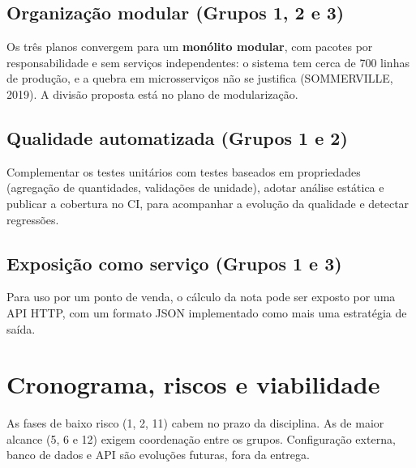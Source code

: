 \subsection{Organização modular (Grupos 1, 2 e 3)}
Os três planos convergem para um \textbf{monólito modular}, com pacotes por responsabilidade e sem serviços independentes: o sistema tem cerca de 700 linhas de produção, e a quebra em microsserviços não se justifica (SOMMERVILLE, 2019). A divisão proposta está no plano de modularização.

\subsection{Qualidade automatizada (Grupos 1 e 2)}
Complementar os testes unitários com testes baseados em propriedades (agregação de quantidades, validações de unidade), adotar análise estática e publicar a cobertura no CI, para acompanhar a evolução da qualidade e detectar regressões.

\subsection{Exposição como serviço (Grupos 1 e 3)}
Para uso por um ponto de venda, o cálculo da nota pode ser exposto por uma API HTTP, com um formato JSON implementado como mais uma estratégia de saída.

\section{Cronograma, riscos e viabilidade}

As fases de baixo risco (1, 2, 11) cabem no prazo da disciplina. As de maior alcance (5, 6 e 12) exigem coordenação entre os grupos. Configuração externa, banco de dados e API são evoluções futuras, fora da entrega.

